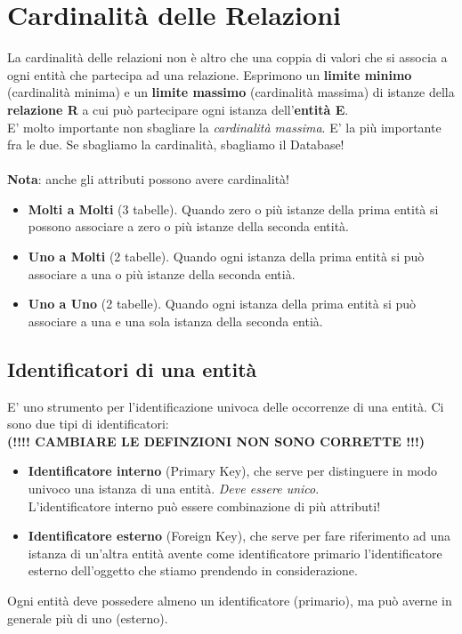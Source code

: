 \documentclass[12pt, a4paper]{article}
\begin{document}
    \section{Cardinalità delle Relazioni}
    La cardinalità delle relazioni non è altro che una coppia di valori che si associa
    a ogni entità che partecipa ad una relazione. 
    Esprimono un \textbf{limite minimo} (cardinalità minima) e un \textbf{limite massimo}
    (cardinalità massima) di istanze della \textbf{relazione R} a cui può partecipare ogni
    istanza dell'\textbf{entità E}.
    \\
    E' molto importante non sbagliare la \textit{cardinalità massima}. E' la più importante fra le due.
    Se sbagliamo la cardinalità, sbagliamo il Database!
    \\\\
    \textbf{Nota}: anche gli attributi possono avere cardinalità!
    \begin{itemize}
        \item \textbf{Molti a Molti} (3 tabelle). Quando zero o più istanze della prima entità si possono associare a zero o più istanze della seconda entità.
        \item \textbf{Uno a Molti} (2 tabelle). Quando ogni istanza della prima entità si può associare a una o più istanze della seconda entià.
        \item \textbf{Uno a Uno} (2 tabelle). Quando ogni istanza della prima entità si può associare a una e una sola istanza della seconda entià.
    \end{itemize}
    \newpage
    \subsection{Identificatori di una entità}
    E' uno strumento per l'identificazione univoca delle occorrenze di una entità.
    Ci sono due tipi di identificatori:
    \\\textbf{(!!!! CAMBIARE LE DEFINZIONI NON SONO CORRETTE !!!)}
    \begin{itemize}
        \item \textbf{Identificatore interno} (Primary Key), che serve per distinguere in modo univoco una istanza di una entità.
        \textit{Deve essere unico}.
        \\L'identificatore interno può essere combinazione di più attributi!
        \item \textbf{Identificatore esterno} (Foreign Key), che serve per fare riferimento ad una istanza di un'altra entità avente come
        identificatore primario l'identificatore esterno dell'oggetto che stiamo prendendo in considerazione.
    \end{itemize}
    Ogni entità deve possedere almeno un identificatore (primario), ma può averne in generale più di uno (esterno).
\end{document}
